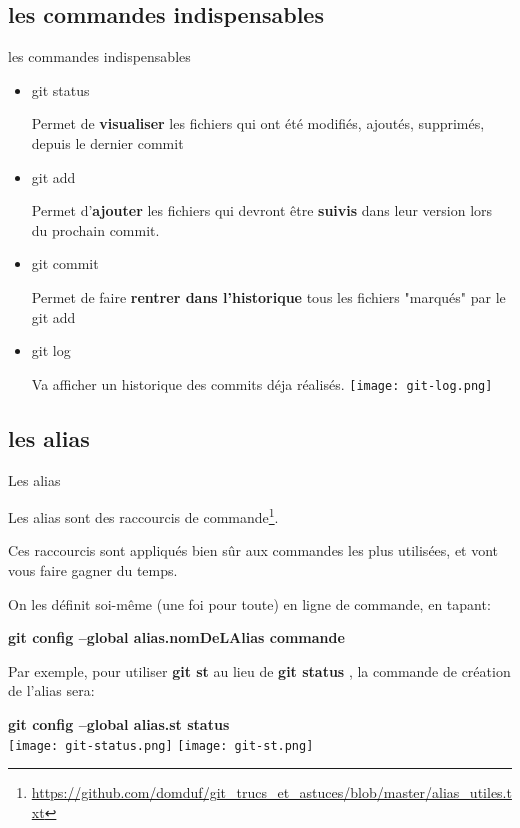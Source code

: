 \documentclass[10pt]{beamer}
\begin{document}
\begin{frame}


\end{frame}

\subsection{les commandes indispensables}

\begin{frame}{les commandes indispensables}
\begin{itemize}
\item git status

Permet de \textbf{visualiser} les fichiers qui ont été modifiés, ajoutés, supprimés, depuis le dernier commit

\item git add

Permet d'\textbf{ajouter} les fichiers qui devront être \textbf{suivis} dans leur version lors du prochain commit.

\item git commit

Permet de faire \textbf{rentrer dans l'historique} tous les fichiers "marqués" par le git add
\item git log

Va afficher un historique des commits déja réalisés.
\texttt{[image: git-log.png]}


\end{itemize}
\end{frame}


\subsection{les alias}

\begin{frame}{Les alias}

Les alias sont des raccourcis de commande\footnote{\url{https://github.com/domduf/git_trucs_et_astuces/blob/master/alias_utiles.txt}}.

Ces raccourcis sont appliqués bien sûr aux commandes les plus utilisées, et vont vous faire gagner du temps.

On les définit soi-même (une foi pour toute) en ligne de commande, en tapant:

 \textbf{git config --global alias.nomDeLAlias commande} 
 
 \smallbreak
 
Par exemple, pour utiliser \textbf{git st} au lieu de \textbf{git status} , la
commande de création de l'alias sera:

\textbf{git config --global alias.st status}\\

\texttt{[image: git-status.png]} \texttt{[image: git-st.png]}



\end{frame}
\end{document}
